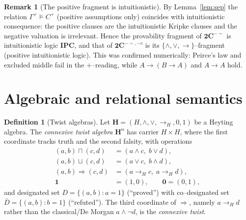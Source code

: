 \documentclass{amsart}
\theoremstyle{plain}
\theoremstyle{definition}
\newtheorem{definition}[theorem]{Definition}
\newtheorem{remark}[theorem]{Remark}
\newcommand{\To}{\rightarrow}
\newcommand{\Ci}{\mathbf{2C}^{-{\sim}}}        %
\newcommand{\Cii}{\mathbf{2C}^{-{\sim},-c}}    %
\begin{document}
\begin{remark}[The positive fragment is intuitionistic]\label{rem:int}
By Lemma~\ref{lem:sep} the relation $\Gamma^{+}\models C^{+}$ (positive
assumptions only) coincides with intuitionistic consequence: the positive
clauses are the intuitionistic Kripke clauses and the negative valuation is
irrelevant. Hence the provability fragment of $\Ci$ is intuitionistic logic
$\mathbf{IPC}$, and that of $\Cii$ is its $\{\wedge,\vee,\To\}$--fragment
(positive intuitionistic logic). This was confirmed numerically: Peirce's law and
excluded middle fail in the $+$--reading, while $A\To(B\To A)$ and $A\To A$ hold.
\end{remark}

\section{Algebraic and relational semantics}\label{sec:alg}

\begin{definition}[Twist algebras]\label{def:twist}
Let $\mathbf H=(H,\wedge,\vee,\To_{H},0,1)$ be a Heyting algebra. The
\emph{connexive twist algebra} $\mathbf H^{\bowtie}$ has carrier $H\times H$,
where the first coordinate tracks truth and the second falsity, with operations
\begin{align*}
(a,b)\sqcap(c,d)&=(a\wedge c,\;b\vee d),\\
(a,b)\sqcup(c,d)&=(a\vee c,\;b\wedge d),\\
(a,b)\Rightarrow(c,d)&=(a\To_{H}c,\;a\To_{H}d),\\
\mathbf 1&=(1,0),\qquad \mathbf 0=(0,1),
\end{align*}
and designated set $D=\{(a,b):a=1\}$ (``proved'') with co--designated set
$\bar D=\{(a,b):b=1\}$ (``refuted''). The third coordinate of $\Rightarrow$,
namely $a\To_{H}d$ rather than the classical/De Morgan $a\wedge\neg d$, is the
\emph{connexive twist}.
\end{definition}
\end{document}
